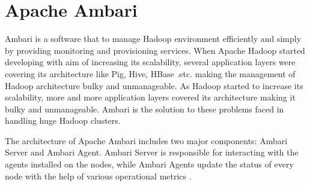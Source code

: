 \section{Apache Ambari} 
Ambari is a software that to manage Hadoop environment
efficiently and simply  by providing monitoring and provisioning services. When
Apache Hadoop started developing with aim of increasing its scalability, several
application layers were covering its architecture like Pig, Hive, HBase .etc.
making the management of Hadoop architecture bulky and unmanageable. As Hadoop
started to increase its scalability, more and more application layers covered
its architecture making it bulky and unmanageable. Ambari is the solution to
these problems faced in handling huge Hadoop clusters.

The architecture of Apache Ambari includes two major components: Ambari Server
and Ambari Agent. Ambari Server is responsible for interacting with the agents
installed on the nodes, while Ambari Agents update the status of every node with
the help of various operational metrics \cite{hid-sp18-401_wiki_Ambari}.
